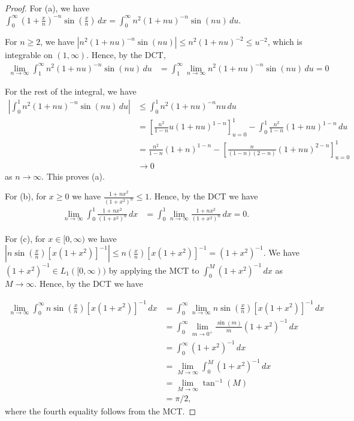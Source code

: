 \documentclass{article}
\begin{document}
\begin{proof}
For (a), we have  $\int_0^\infty \left( 1 + \frac x n \right)^{-n} \sin \left(\frac x n \right) \, dx  = \int_0^\infty n^2 ( 1 + n u )^{-n} \sin(nu) \, du$.

For $n \ge 2$, we have $\left| n^2 ( 1 + n u )^{-n} \sin(nu) \right| \le  n^2 (1 + nu)^{-2} \le u^{-2}$, which is integrable on $(1, \infty)$.  Hence, by the DCT, 
\begin{align*}
 \lim_{n\to \infty} \int_1^\infty n^2 ( 1 + n u)^{-n} \sin(nu) \, du  & = \int_1^\infty \lim_{n\to \infty} n^2 ( 1 + n u)^{-n} \sin(nu) \, du
 = 0
\end{align*}

For the rest of the integral, we have
\begin{align*}
\left| \int_0^1 n^2 ( 1 + n u)^{-n} \sin(nu) \, du \right| & \le \int_0^1 n^2 (1 + nu )^{-n} nu \, du 
\\ & = \left[ \frac{n^2}{1 - n} u (1+nu)^{1-n} \right]_{u=0}^1 - \int_0^1 \frac{n^2}{1-n} (1+nu)^{1-n} \, du
\\ & = \frac{n^2}{1-n} (1+n)^{1-n} - \left[ \frac{n}{(1-n)(2-n)} (1+nu)^{2-n} \right]_{u=0}^1
\\ & \to 0
\end{align*}
as $n \to \infty$.  This proves (a).

For (b), for $x \ge 0$ we have $\frac{1 + n x^2} {(1 + x^2)^n} \le 1$. Hence, by the DCT we have
\begin{align*}
\lim_{n \to \infty} \int_0^1 \frac{1 + n x^2} {(1 + x^2)^n} \, dx & = \int_0^1 \lim_{n \to \infty} \frac{1 + n x^2} {(1 + x^2)^n} \, dx 
 = 0.
\end{align*}

For (c), for $x \in [0,\infty)$ we have $ \left| n\sin \left( \frac x n \right) [x(1+x^2)]^{-1} \right| \le n \left(\frac x n \right) [x(1+x^2)]^{-1} = (1+x^2)^{-1}$.  We have $(1+x^2)^{-1} \in L_1([0,\infty))$ by applying the MCT to $\int_0^M (1+x^2)^{-1} \, dx$ as $M \to \infty$.  Hence, by the DCT we have

\begin{align*}
\lim_{n \to \infty} \int_0^\infty n \sin \left( \frac x n \right) [x(1+x^2)]^{-1} \, dx  & = \int_0^\infty \lim_{n \to \infty} n \sin \left( \frac x n \right) [x(1+x^2)]^{-1} \, dx 
\\ & = \int_0^\infty \lim_{m \to 0^+}  \frac {\sin (m)}{m}  (1+x^2)^{-1} \, dx 
\\ & = \int_0^\infty  (1+x^2)^{-1} \, dx 
\\ & = \lim_{M \to \infty} \int_0^M (1+x^2)^{-1} \, dx 
\\ & = \lim_{M \to \infty} \tan^{-1}(M)
\\ & = \pi/2,
\end{align*}
where the fourth equality follows from the MCT.


\end{proof}
\end{document}
